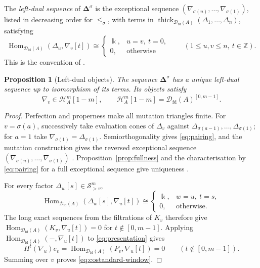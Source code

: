 \documentclass[11pt,a4paper]{article}
\newcommand{\defn}[1]{\textsl{\color{darkblue} #1}}
\newcommand{\D}{\mathcal D}
\renewcommand{\H}{\mathcal H}
\newcommand{\ZZ}{\mathbb{Z}}
\newcommand{\std}{\Delta}
\newcommand{\costd}{\nabla}
\DeclareMathOperator{\fd}{fd}
\DeclareMathOperator{\Hom}{Hom}
\DeclareMathOperator{\thick}{thick}
\theoremstyle{plain}
\newtheorem{proposition}[theorem]{Proposition}
\theoremstyle{definition}
\numberwithin{equation}{section}
\begin{document}
The \defn{left-dual sequence} of $\boldsymbol\std^\sigma$ is the
exceptional sequence
$(\costd_{\sigma(n)},\ldots,\costd_{\sigma(1)})$, listed in decreasing
order for $\leq_\sigma$, with terms in
$\thick_{\D_{\fd}(A)}(\std_1,\ldots,\std_n)$, satisfying
\begin{equation}\label{eq:pairing}
 \Hom_{\D_{\fd}(A)}(\std_u,\costd_v[t])\cong
 \begin{cases}\Bbbk,&u=v,\ t=0,\\0,&\text{otherwise}
 \end{cases}
 \qquad(1\leq u,v\leq n,\ t\in\ZZ).
\end{equation}
This is the convention of \cite[\S2.3]{BB26}.

\begin{proposition}[Left-dual objects]\label{prop:costandards}
The sequence $\boldsymbol\std^\sigma$ has a unique left-dual sequence
up to isomorphism of its terms. Its objects satisfy
\begin{equation}\label{eq:costandard-window}
 \costd_v\in\H_A^m[1-m],\qquad
 \H_A^m[1-m]=\D_{\fd}(A)^{[0,m-1]}.
\end{equation}
\end{proposition}
\begin{proof}
Perfection and properness make all mutation triangles finite.
For $v=\sigma(a)$, successively take evaluation cones of
$\std_v$ against
$\std_{\sigma(a-1)},\ldots,\std_{\sigma(1)}$; for $a=1$ take
$\costd_{\sigma(1)}=\std_{\sigma(1)}$.
Semiorthogonality gives \eqref{eq:pairing}, and the mutation
construction gives the reversed exceptional sequence
$(\costd_{\sigma(n)},\ldots,\costd_{\sigma(1)})$
\cite[\S2.3]{BB26}.
Proposition~\ref{prop:fullness} and the characterisation by
\eqref{eq:pairing} for a full exceptional sequence give uniqueness
\cite[\S2.3]{BB26}.

For every factor $\std_w[s]\in\mathcal S_{>v}^{m}$,
\begin{equation}\label{eq:factor-pairing}
 \Hom_{\D_{\fd}(A)}(\std_w[s],\costd_u[t])\cong
 \begin{cases}\Bbbk,&w=u,\ t=s,\\0,&\text{otherwise}.
 \end{cases}
\end{equation}
The long exact sequences from the filtrations of $K_v$ therefore give
$\Hom_{\D_{\fd}(A)}(K_v,\costd_u[t])=0$ for
$t\notin[0,m-1]$. Applying $\Hom_{\D_{\fd}(A)}(-,\costd_u[t])$
to \eqref{eq:presentation} gives
\[
 H^t(\costd_u)e_v
 =\Hom_{\D_{\fd}(A)}(P_v,\costd_u[t])=0
 \qquad(t\notin[0,m-1]).
\]
Summing over $v$ proves \eqref{eq:costandard-window}.
\end{proof}
\end{document}
